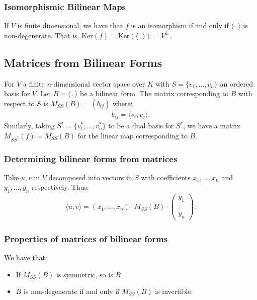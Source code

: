 \documentclass[a4paper, 12pt, twoside]{article}
\begin{document}
\subsubsection{Isomorphismic Bilinear Maps}

If $V$ is finite dimensional, we have that $f$ is an isomorphism if and only if 
$\langle \, , \rangle$ is non-degenerate. That is, $\text{Ker}(f) 
= \text{Ker}(\langle \, , \rangle) = V^\perp$.

\subsection{Matrices from Bilinear Forms}

For $V$ a finite $n$-dimensional vector space over $K$ with $S = \{v_1, \ldots, v_n\}$
an ordered basis for $V$. Let $B = \langle \, , \rangle$ be a bilinear form. The matrix corresponding
to $B$ with respect to $S$ is $M_{SS}(B) = (b_{ij})$ where: \begin{gather*}
  b_{ij} = \langle v_i, v_j \rangle.
\end{gather*} Similarly, taking $S^* = \{v^*_1, \ldots, v^*_n\}$ to be a dual basis for
$S^*$, we have a matrix $M_{SS^*}(f) = M_{SS}(B)$ for the linear map corresponding to $B$.

\subsubsection{Determining bilinear forms from matrices}

Take $u, v$ in $V$ decomposed into vectors in $S$ with coefficients $x_1, \ldots, x_n$
and $y_1, \ldots, y_n$ respectively. Thus: \begin{gather*}
  \langle u, v \rangle = (x_1, \ldots, x_n) \cdot M_{SS}(B) \cdot \begin{pmatrix}
    y_1 \\ \vdots \\ y_n
  \end{pmatrix}.
\end{gather*}

\subsubsection{Properties of matrices of bilinear forms}

We have that: \begin{itemize}
  \item If $M_{SS}(B)$ is symmetric, so is $B$
  \item $B$ is non-degenerate if and only if $M_{SS}(B)$ is invertible.
\end{itemize}
\end{document}

